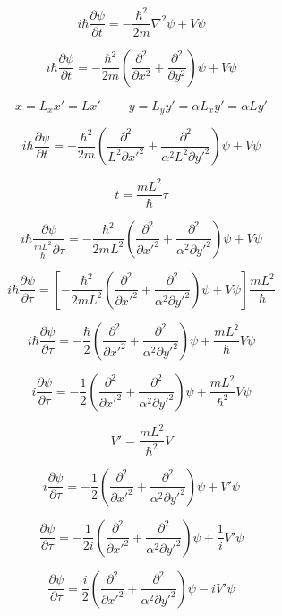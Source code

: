 \documentclass{article}
\begin{document}
\[
i\hbar\dfrac{\partial \psi}{\partial t} = -\dfrac{\hbar^2}{2m}\nabla^2\psi+V\psi
\]

\[
i\hbar\dfrac{\partial \psi}{\partial t} = -\dfrac{\hbar^2}{2m}\left(\dfrac{\partial^2}{\partial x^2}+\dfrac{\partial^2}{\partial y^2}\right)\psi+V\psi
\]

\[
x=L_xx'=Lx'\;\;\;\;\;\;\;\;y=L_yy'=\alpha L_xy'=\alpha Ly'
\]

\[
i\hbar\dfrac{\partial \psi}{\partial t} = -\dfrac{\hbar^2}{2m}\left(\dfrac{\partial^2}{L^2\partial x'^2}+\dfrac{\partial^2}{\alpha^2L^2\partial y'^2}\right)\psi+V\psi
\]

\[
t=\dfrac{mL^2}{\hbar}\tau
\]

\[
i\hbar\dfrac{\partial \psi}{\frac{mL^2}{\hbar}\partial \tau} = -\dfrac{\hbar^2}{2mL^2}\left(\dfrac{\partial^2}{\partial x'^2}+\dfrac{\partial^2}{\alpha^2\partial y'^2}\right)\psi+V\psi
\]

\[
i\hbar\dfrac{\partial \psi}{\partial \tau} = \left[-\dfrac{\hbar^2}{2mL^2}\left(\dfrac{\partial^2}{\partial x'^2}+\dfrac{\partial^2}{\alpha^2\partial y'^2}\right)\psi+V\psi\right]\dfrac{mL^2}{\hbar}
\]

\[
i\hbar\dfrac{\partial \psi}{\partial \tau} = -\dfrac{\hbar}{2}\left(\dfrac{\partial^2}{\partial x'^2}+\dfrac{\partial^2}{\alpha^2\partial y'^2}\right)\psi+\dfrac{mL^2}{\hbar}V\psi
\]

\[
i\dfrac{\partial \psi}{\partial \tau} = -\dfrac{1}{2}\left(\dfrac{\partial^2}{\partial x'^2}+\dfrac{\partial^2}{\alpha^2\partial y'^2}\right)\psi+\dfrac{mL^2}{\hbar^2}V\psi
\]

\[V'=\dfrac{mL^2}{\hbar^2}V\]

\[
i\dfrac{\partial \psi}{\partial \tau} = -\dfrac{1}{2}\left(\dfrac{\partial^2}{\partial x'^2}+\dfrac{\partial^2}{\alpha^2\partial y'^2}\right)\psi+V'\psi
\]

\[
\dfrac{\partial \psi}{\partial \tau} = -\dfrac{1}{2i}\left(\dfrac{\partial^2}{\partial x'^2}+\dfrac{\partial^2}{\alpha^2\partial y'^2}\right)\psi+\dfrac{1}{i}V'\psi
\]

\[
\dfrac{\partial \psi}{\partial \tau} = \dfrac{i}{2}\left(\dfrac{\partial^2}{\partial x'^2}+\dfrac{\partial^2}{\alpha^2\partial y'^2}\right)\psi-iV'\psi
\]
\end{document}
